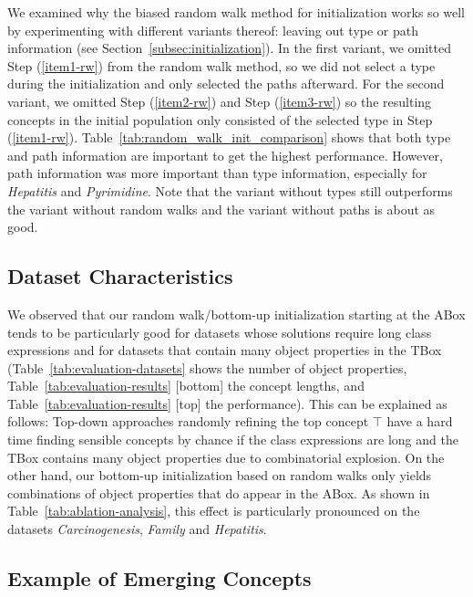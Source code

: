 

We examined why the biased random walk method for initialization works so well by experimenting with different variants thereof: leaving out type or path information (see Section~\ref{subsec:initialization}). In
the first variant, we omitted Step (\ref{item1-rw}) from the random walk method, so we did not select a type during the initialization and only selected the paths afterward. For the second variant, we omitted Step (\ref{item2-rw}) and Step (\ref{item3-rw}) so the resulting concepts in the initial population only consisted of the selected type in Step (\ref{item1-rw}). Table~\ref{tab:random_walk_init_comparison}
shows that both type and path information are important to get the highest performance.  
However, path information was more important than type information, especially for \textit{Hepatitis} and \textit{Pyrimidine}. Note that the variant without types still outperforms the variant without random walks and the variant without paths is about as good.

\subsection{Dataset Characteristics}%
\label{subsec:evaluation-dataset-characteristics}

We observed that our random walk/bottom-up initialization starting at the ABox tends to be particularly good for datasets whose solutions require long class expressions and for datasets that contain many object properties in the TBox (Table~\ref{tab:evaluation-datasets} shows the number of object properties, Table~\ref{tab:evaluation-results} [bottom] the concept lengths, and Table~\ref{tab:evaluation-results} [top] the performance). This can be explained as follows: Top-down approaches randomly refining the top concept $\top$ have a hard time finding sensible concepts by chance if the class expressions are long and the TBox contains many object properties due to combinatorial explosion. On the other hand, our bottom-up initialization based on random walks only yields combinations of object properties that do appear in the ABox. As shown in Table~\ref{tab:ablation-analysis}, this effect is particularly pronounced on the datasets \textit{Carcinogenesis}, \textit{Family} and \textit{Hepatitis}. 

\subsection{Example of Emerging Concepts}%
\label{subsec:evaluation-example}

